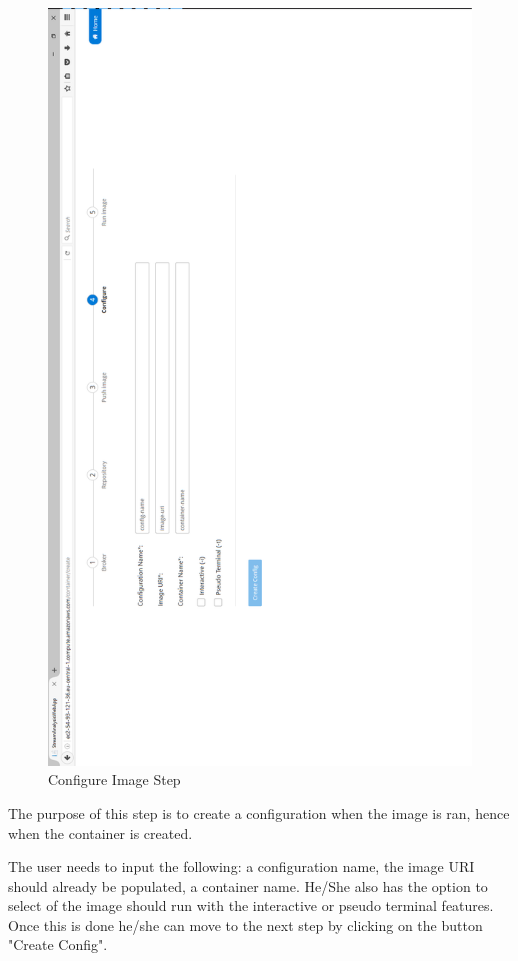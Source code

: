 \begin{figure}[p]
	\centering
	\noindent
	\includegraphics[width=0.5\paperwidth]{./images/guide/container/configure.PNG}
	\caption{Configure Image Step}
	\label{fig:configure}
\end{figure}

The purpose of this step is to create a configuration when the image is ran, hence when the container is created.

The user needs to input the following: a configuration name, the image URI should already be populated, a container name. He/She also has the option to select of the image should run with the interactive or pseudo terminal features. Once this is done he/she can move to the next step by clicking on the button "Create Config".

